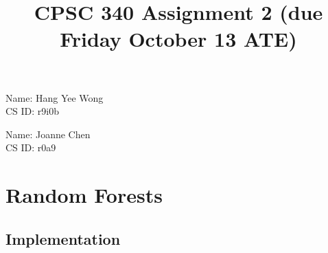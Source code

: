 \documentclass{article}
\begin{document}
\title{CPSC 340 Assignment 2 (due Friday October 13 ATE)}
\author{}
\date{}
\maketitle
\vspace{-4em}

Name: Hang Yee Wong\\
CS ID: r9i0b

Name: Joanne Chen\\
CS ID: r0a9

\section{Random Forests}

 
 \subsection{Implementation}
\end{document}
